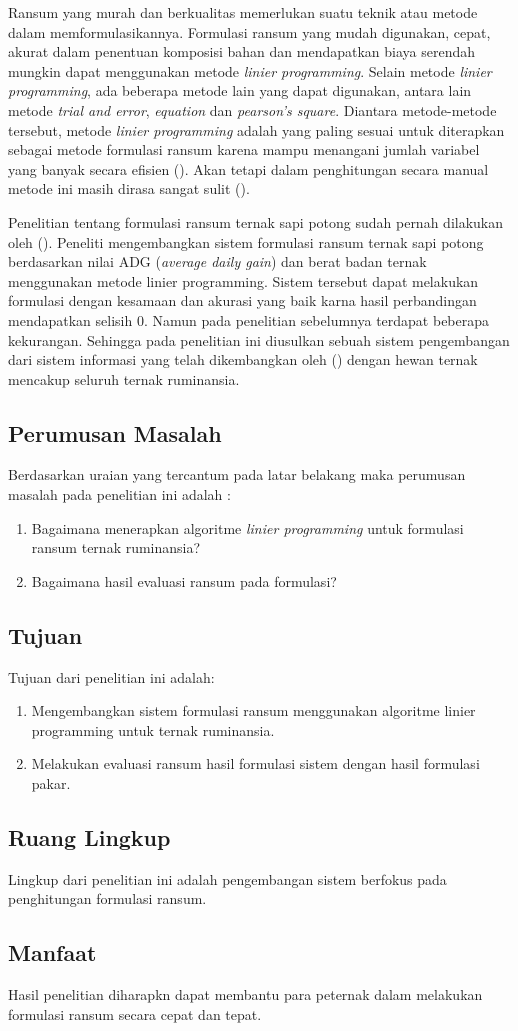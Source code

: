 Ransum yang murah dan berkualitas memerlukan suatu teknik atau metode dalam memformulasikannya. Formulasi ransum yang mudah digunakan, cepat, akurat dalam penentuan komposisi bahan dan mendapatkan biaya serendah mungkin dapat menggunakan metode \textit{linier programming}. Selain metode \textit{linier programming}, ada beberapa metode lain yang dapat digunakan, antara lain metode \textit{trial and error}, \textit{equation} dan \textit{pearson’s square}. Diantara metode-metode tersebut, metode \textit{linier programming} adalah yang paling sesuai untuk diterapkan sebagai metode formulasi ransum karena mampu menangani jumlah variabel yang banyak secara efisien (\cite{Muzayyanah2013}). Akan tetapi dalam penghitungan secara manual metode ini masih dirasa sangat sulit (\cite{Kusnandar2004}).

Penelitian tentang formulasi ransum ternak sapi potong sudah pernah dilakukan oleh \citeauthor{Rahman2017} (\cite*{Rahman2017}). Peneliti mengembangkan sistem formulasi ransum ternak sapi potong berdasarkan nilai ADG (\textit{average daily gain}) dan berat badan ternak menggunakan metode linier programming. Sistem tersebut dapat melakukan formulasi dengan kesamaan dan akurasi yang baik karna hasil perbandingan mendapatkan selisih 0. Namun pada penelitian sebelumnya terdapat beberapa kekurangan. Sehingga pada penelitian ini diusulkan sebuah sistem pengembangan dari sistem informasi yang telah dikembangkan oleh \citeauthor{Rahman2017} (\cite*{Rahman2017}) dengan hewan ternak mencakup seluruh ternak ruminansia.

\subsection*{Perumusan Masalah}
Berdasarkan uraian yang tercantum pada latar belakang maka perumusan masalah pada penelitian ini adalah :
\begin{enumerate}[noitemsep] 
	\item Bagaimana menerapkan algoritme \textit{linier programming }untuk formulasi ransum ternak ruminansia?
	\item Bagaimana hasil evaluasi ransum pada formulasi?
\end{enumerate}

\subsection*{Tujuan}
Tujuan dari penelitian ini adalah:
\begin{enumerate}[noitemsep]
	\item Mengembangkan sistem formulasi ransum menggunakan algoritme linier programming untuk ternak ruminansia.
	\item Melakukan evaluasi ransum hasil formulasi sistem dengan hasil formulasi pakar.
\end{enumerate}

\subsection*{Ruang Lingkup}
Lingkup dari penelitian ini adalah pengembangan sistem berfokus pada penghitungan formulasi ransum.

\subsection*{Manfaat}
Hasil penelitian diharapkn dapat membantu para peternak dalam melakukan formulasi ransum secara cepat dan tepat.